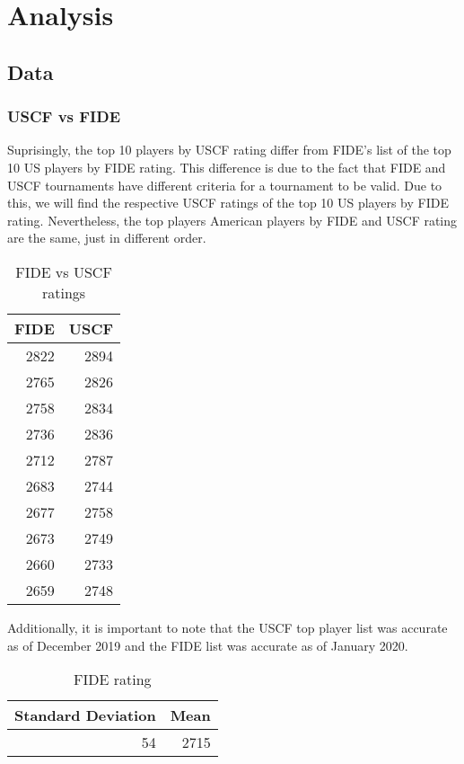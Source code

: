 \documentclass[12pt]{article}
\begin{document}
\section{Analysis}
\subsection{Data}
\subsubsection{USCF vs FIDE}
Suprisingly, the top 10 players by USCF rating differ from FIDE's list of the top 10 US players by FIDE rating. This difference is due to the fact that FIDE and USCF tournaments have different criteria for a tournament to be valid. Due to this, we will find the respective USCF ratings of the top 10 US players by FIDE rating. Nevertheless, the top players American players by FIDE and USCF rating are the same, just in different order.

\begin{table}[H]
\begin{center}
\begin{tabular}{rr}
FIDE & USCF\\
\hline
2822 & 2894\\
2765 & 2826\\
2758 & 2834\\
2736 & 2836\\
2712 & 2787\\
2683 & 2744\\
2677 & 2758\\
2673 & 2749\\
2660 & 2733\\
2659 & 2748\\
\end{tabular}
    \caption{FIDE vs USCF ratings}
\end{center}
\end{table}
Additionally, it is important to note that the USCF top player list was accurate as of December 2019 and the FIDE list was accurate as of January 2020. 


\begin{table}[H]
\begin{center}
\begin{tabular}{rr}
Standard Deviation & Mean\\
\hline
54 & 2715\\
\end{tabular}
    \caption{FIDE rating}
\end{center}
\end{table}
\end{document}
